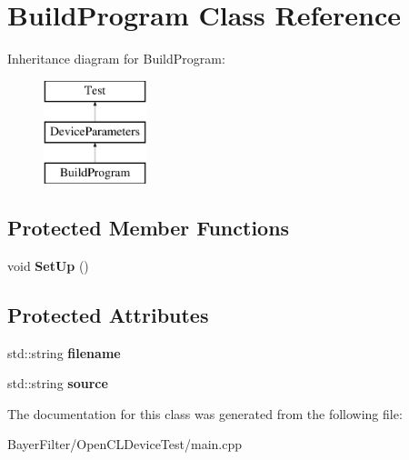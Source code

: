 \hypertarget{class_build_program}{\section{Build\-Program Class Reference}
\label{class_build_program}
}
Inheritance diagram for Build\-Program\-:\begin{figure}[H]
\begin{center}
\leavevmode
\includegraphics[height=3.000000cm]{class_build_program}
\end{center}
\end{figure}
\subsection*{Protected Member Functions}
\begin{DoxyCompactItemize}
\item 
\hypertarget{class_build_program_a29abaecca11f8bdf1a1fcf1c09b098cb}{void {\bfseries Set\-Up} ()}\label{class_build_program_a29abaecca11f8bdf1a1fcf1c09b098cb}

\end{DoxyCompactItemize}
\subsection*{Protected Attributes}
\begin{DoxyCompactItemize}
\item 
\hypertarget{class_build_program_a7e5110be7d60e62e1d7cf7683a87f401}{std\-::string {\bfseries filename}}\label{class_build_program_a7e5110be7d60e62e1d7cf7683a87f401}

\item 
\hypertarget{class_build_program_a4be1110103d731e0fb33731d335d0b75}{std\-::string {\bfseries source}}\label{class_build_program_a4be1110103d731e0fb33731d335d0b75}

\end{DoxyCompactItemize}


The documentation for this class was generated from the following file\-:\begin{DoxyCompactItemize}
\item 
Bayer\-Filter/\-Open\-C\-L\-Device\-Test/main.\-cpp\end{DoxyCompactItemize}
